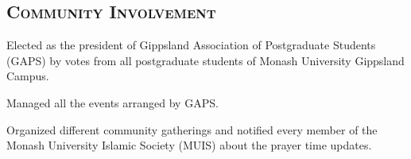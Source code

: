 \begin{resume}
\section{\textsc{Community Involvement}}

\begin{position}
Elected as the president of Gippsland Association of Postgraduate Students (GAPS) by votes from all postgraduate students of Monash University Gippsland Campus.
\end{position}
\vspace{-0.2cm}
\begin{position}
Managed all the events arranged by GAPS.
\end{position}
\vspace{-0.2cm}
\begin{position}
Organized different community gatherings and notified every member of the Monash University Islamic Society (MUIS) about the prayer time updates.
\end{position}




\end{resume}

